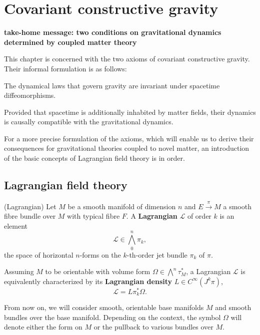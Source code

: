 \chapter{Covariant constructive gravity}

\textbf{take-home message: two conditions on gravitational dynamics determined by coupled matter theory}


This chapter is concerned with the two axioms of covariant constructive gravity. Their informal formulation is as follows:
\begin{axiom}
  The dynamical laws that govern gravity are invariant under spacetime diffeomorphisms. \cite{cgg paper}
\end{axiom}
\begin{axiom}
  Provided that spacetime is additionally inhabited by matter fields, their dynamics is causally compatible with the gravitational dynamics. \cite{cgg paper}
\end{axiom}

For a more precise formulation of the axioms, which will enable us to derive their consequences for gravitational theories coupled to novel matter, an introduction of the basic concepts of Lagrangian field theory is in order.

\section{Lagrangian field theory}

\begin{definition}{(Lagrangian)}
  Let $M$ be a smooth manifold of dimension $n$ and $E \overset{\pi}{\longrightarrow} M$ a smooth fibre bundle over $M$ with typical fibre $F$. A \textbf{Lagrangian} $\mathcal L$ of order $k$ is an element
  \begin{equation}
    \mathcal L \in \textstyle\bigwedge^n_0\pi_k,
  \end{equation}
the space of horizontal $n$-forms on the $k$-th-order jet bundle $\pi_k$ of $\pi$.

  Assuming $M$ to be orientable with volume form $\Omega\in\bigwedge^n\tau_M^\ast$, a Lagrangian $\mathcal L$ is equivalently characterized by its \textbf{Lagrangian density} $L\in C^\infty(J^k\pi)$,
\begin{equation}
  \mathcal L = L\pi_k^\ast\Omega.
\end{equation}
\end{definition}

From now on, we will consider smooth, orientable base manifolds $M$ and smooth bundles over the base manifold. Depending on the context, the symbol $\Omega$ will denote either the form on $M$ or the pullback to various bundles over $M$.

